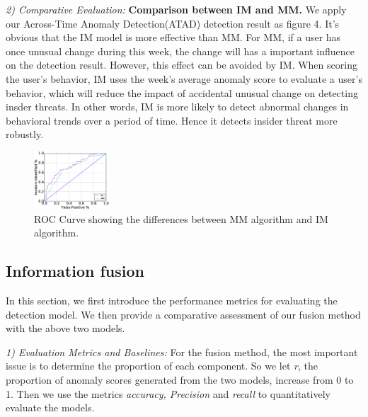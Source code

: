 \documentclass[conference]{IEEEtran}
\begin{document}
\emph{2) Comparative Evaluation:} 
\textbf{Comparison between IM and MM.}
We apply our Across-Time Anomaly Detection(ATAD) detection result as figure 4. It's obvious that the IM model is more effective than MM. For MM, if a user has once unusual change during this week, the change will has a important influence on the detection result. However, this effect can be avoided by IM. When scoring the user's behavior, IM uses the week's average anomaly score to evaluate a user's behavior, which will reduce the impact of accidental unusual change on detecting insder threats.
In other words, IM is more likely to detect abnormal changes in behavioral trends over a period of time. Hence it detects insider threat more robustly. 



\begin{figure}[htb]
\centerline{\includegraphics[width = 0.25\textwidth]{figure/figure7.eps}}
\caption{ROC Curve showing the differences between MM algorithm and IM algorithm.}
\label{fig}
\end{figure}


\subsection{Information fusion}
In this section,  we first introduce the performance metrics for evaluating the detection model.
We then provide a comparative assessment of our fusion method with the above two models.

\emph{1) Evaluation Metrics and Baselines:}
For the fusion method, the most important issue is to determine the proportion of each component. So we let \emph{r}, the proportion of anomaly scores generated from the two models, increase from 0 to 1. Then we use the metrics \emph{accuracy, Precision} and \emph{recall} to quantitatively evaluate the models.
\end{document}

